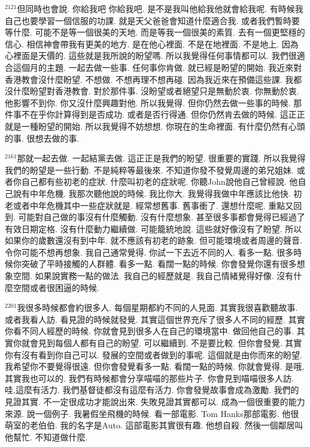 \documentclass{book}
\begin{document}
$^{2121}$但同時也會說.
你給我吧 你給我吧.
是不是我叫他給我他就會給我呢.
有時候我自己也要學習一個信服的功課.
就是天父爸爸會知道什麼適合我.
或者我們暫時要等什麼.
可能不是等一個很美的天地.
而是等我一個很美的素質.
去有一個更堅穩的信心.
相信神會帶我有更美的地方.
是在他心裡面.
不是在地裡面.
不是地上.
因為心裡面是天價的.
這些就是我所說的盼望嗎.
所以我覺得任何事情都可以.
我們很適合這個月的主題.
一起去做一些事.
任何事你肯做.
就已經是盼望的開始.
我近來對香港教會沒什麼盼望.
不想做.
不想再理不想再碰.
因為我近來在預備這些課.
我都沒什麼盼望對香港教會.
對於那件事.
沒盼望或者絕望只是無動於衷.
你無動於衷.
他影響不到你.
你又沒什麼興趣對他.
所以我覺得.
但你仍然去做一些事的時候.
那件事不在乎你計算得到是否成功.
或者是否行得通.
但你仍然肯去做的時候.
這正正就是一種盼望的開始.
所以我覺得不妨想想.
你現在的生命裡面.
有什麼仍然有心頭的事.
很想去做的事.

$^{2161}$那就一起去做.
一起結黨去做.
這正正是我們的盼望.
很重要的實踐.
所以我覺得我們的盼望是一些行動.
不是純粹等最後來.
不知道你發不發覺周邊的弟兄姐妹.
或者你自己都有些初老的症狀.
什麼叫初老的症狀呢.
你聽John說他自己曾經說.
他自己說有中年危機.
我那次聽他說的時候.
我比你大.
我覺得我做中年應該比他快.
初老或者中年危機其中一些症狀就是.
經常想舊事.
舊事衝了.
還想什麼呢.
重點又回到.
可能對自己做的事沒有什麼觸動.
沒有什麼想象.
甚至很多事都會覺得已經過了有效日期定格.
沒有什麼動力繼續做.
可能籠統地說.
這些就好像沒有了盼望.
所以如果你的歲數還沒有到中年.
就不應該有初老的跡象.
但可能環境或者周邊的聲音.
令你可能不想再想象.
我自己通常覺得.
你試一下去近不同的人.
看多一點.
很多時候你突破了平時接觸的人群體.
看多一點.
看闊一點的時候.
你會發覺你還有很多想象空間.
如果說實務一點的做法.
我自己的經歷就是.
我自己情緒覺得好像.
沒有什麼空間或者很困逼的時候.

$^{2201}$我很多時候都會約很多人.
每個星期都約不同的人見面.
其實我很喜歡聽故事.
或者我看人訪.
看見證的時候就發覺.
其實這個世界充斥了很多人不同的經歷.
其實你看不同人經歷的時候.
你就會見到很多人在自己的環境當中.
做回他自己的事.
其實你就會見到每個人都有自己的盼望.
可以繼續到.
不是要比較.
但你會發覺.
其實你有沒有看到你自己可以.
發展的空間或者做到的事呢.
這個就是由你而來的盼望.
我希望你不要覺得很遠.
但你會發覺看多一點.
看闊一點的時候.
你就會覺得.
是哦,其實我也可以的.
我們有時候都會分享喵喵的那些片子.
你會見到喵喵很多人訪.
哇,這麼有活力.
我們基督徒都沒有這麼有活力.
你會發覺故事會成為激勵.
我們的見證其實.
不一定很成功才能說出來.
失敗見證其實都可以.
成為一個很重要的能力來源.
說一個例子.
我暑假坐飛機的時候.
看一部電影.
Tom Hanks那部電影.
他很萌室的老伯伯.
我的名字是Auto.
這部電影其實很有趣.
他想自殺.
然後一個鄰居叫他幫忙.
不知道做什麼.
\end{document}
